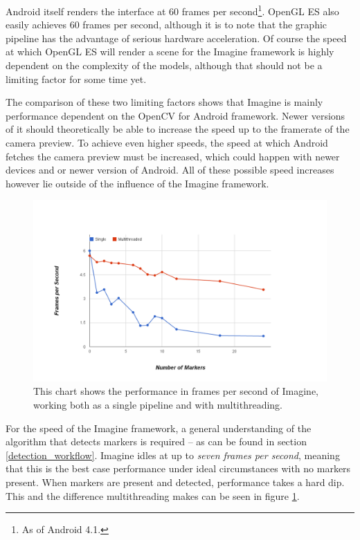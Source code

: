 Android itself renders the interface at 60 frames per second\footnote{As of Android 4.1.}.
OpenGL ES also easily achieves 60 frames per second, although it is to note that the graphic pipeline has the advantage of serious hardware acceleration.
Of course the speed at which OpenGL ES will render a scene for the Imagine framework is highly dependent on the complexity of the models, although that should not be a limiting factor for some time yet.

The comparison of these two limiting factors shows that Imagine is mainly performance dependent on the OpenCV for Android framework.
Newer versions of it should theoretically be able to increase the speed up to the framerate of the camera preview.
To achieve even higher speeds, the speed at which Android fetches the camera preview must be increased, which could happen with newer devices and or newer version of Android.
All of these possible speed increases however lie outside of the influence of the Imagine framework.

\begin{figure}[H]
	\centering
	\includegraphics[width=16cm]{img/performance_chart.png}
	\caption[Imagine Performance Chart.]{This chart shows the performance in frames per second of Imagine, working both as a single pipeline and with multithreading.}
	\label{fig:performance_chart}
\end{figure}

For the speed of the Imagine framework, a general understanding of the algorithm that detects markers is required – as can be found in section \ref{detection_workflow}.
Imagine idles at up to \textit{seven frames per second}, meaning that this is the best case performance under ideal circumstances with no markers present.
When markers are present and detected, performance takes a hard dip.
This and the difference multithreading makes can be seen in figure \ref{fig:performance_chart}.

